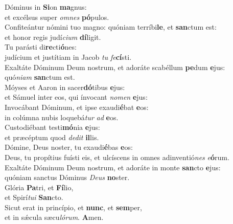 \evenverse Dóminus in \textbf{Si}on \textbf{ma}gnus:~\*\\
\evenverse et excélsus super \textit{om}\textit{nes} \textbf{pó}pulos.\\
\oddverse Confiteántur nómini tuo magno: quóniam terríbi\textbf{le}, et \textbf{san}ctum est:~\*\\
\oddverse et honor regis judí\textit{ci}\textit{um} \textbf{dí}ligit.\\
\evenverse Tu parásti di\textbf{re}cti\textbf{ó}nes:~\*\\
\evenverse judícium et justítiam in Jacob \textit{tu} \textit{fe}\textbf{cí}sti.\\
\oddverse Exaltáte Dóminum Deum nostrum, et adoráte scabéllum \textbf{pe}dum \textbf{e}jus:~\*\\
\oddverse quó\textit{ni}\textit{am} \textbf{san}ctum est.\\
\evenverse Móyses et Aaron in sacer\textbf{dó}tibus \textbf{e}jus:~\*\\
\evenverse et Sámuel inter eos, qui ínvocant \textit{no}\textit{men} \textbf{e}jus:\\
\oddverse Invocábant Dóminum, et ipse exaudi\textbf{é}bat \textbf{e}os:~\*\\
\oddverse in colúmna nubis loquebá\textit{tur} \textit{ad} \textbf{e}os.\\
\evenverse Custodiébant testi\textbf{mó}nia \textbf{e}jus:~\*\\
\evenverse et præcéptum quod \textit{de}\textit{dit} \textbf{il}lis.\\
\oddverse Dómine, Deus noster, tu exaudi\textbf{é}bas \textbf{e}os:~\*\\
\oddverse Deus, tu propítius fuísti eis, et ulcíscens in omnes adinventió\textit{nes} \textit{e}\textbf{ó}rum.\\
\evenverse Exaltáte Dóminum Deum nostrum, et adoráte in monte \textbf{san}cto \textbf{e}jus:~\*\\
\evenverse quóniam sanctus Dóminus \textit{De}\textit{us} \textbf{no}ster.\\
\oddverse Glória \textbf{Pa}tri, et \textbf{Fí}lio,~\*\\
\oddverse et Spirí\textit{tu}\textit{i} \textbf{San}cto.\\
\evenverse Sicut erat in princípio, et \textbf{nunc}, et \textbf{sem}per,~\*\\
\evenverse et in sǽcula sæcu\textit{ló}\textit{rum}. \textbf{A}men.\\
